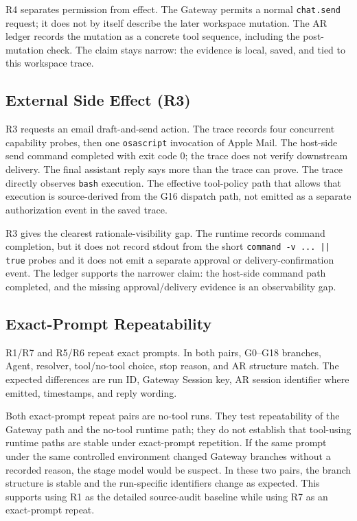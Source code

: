 \documentclass[11pt,a4paper]{article}
\begin{document}
R4 separates permission from effect. The Gateway permits a normal
\texttt{chat.send} request; it does not by itself describe the later
workspace mutation. The AR ledger records the mutation as a concrete tool
sequence, including the post-mutation check. The claim stays narrow: the
evidence is local, saved, and tied to this workspace trace.

\subsection{External Side Effect (R3)}

R3 requests an email draft-and-send action. The trace records four
concurrent capability probes, then one \texttt{osascript} invocation of
Apple Mail. The host-side send command completed with exit code 0; the
trace does not verify downstream delivery. The final assistant reply says
more than the trace can prove. The trace directly observes \texttt{bash}
execution. The effective tool-policy path that allows that execution is
source-derived from the G16 dispatch path, not emitted as a separate
authorization event in the saved trace.

R3 gives the clearest rationale-visibility gap. The runtime records
command completion, but it does not record stdout from the short
\texttt{command -v ... || true} probes and it does not emit a separate
approval or delivery-confirmation event. The ledger supports the narrower
claim: the host-side command path completed, and the missing
approval/delivery evidence is an observability gap.

\subsection{Exact-Prompt Repeatability}

\begin{table}[H]
\centering
\caption{Exact-prompt repeatability checks.}
\label{tab:repeatability}
{\scriptsize

}
\end{table}

R1/R7 and R5/R6 repeat exact prompts. In both pairs, G0--G18 branches,
Agent, resolver, tool/no-tool choice, stop reason, and AR structure match.
The expected differences are run ID, Gateway Session key, AR session
identifier where emitted, timestamps, and reply wording.

Both exact-prompt repeat pairs are no-tool runs. They test repeatability
of the Gateway path and the no-tool runtime path; they do not establish
that tool-using runtime paths are stable under exact-prompt repetition.
If the same prompt under the same controlled environment changed Gateway
branches without a recorded reason, the stage model would be suspect. In
these two pairs, the branch structure is stable and the run-specific
identifiers change as expected. This supports using R1 as the detailed
source-audit baseline while using R7 as an exact-prompt repeat.
\end{document}
